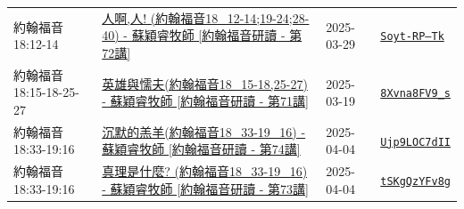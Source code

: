 \documentclass{book}
\begin{document}
{\begin{xltabular}{\textwidth}{|p{0.15\textwidth} p{0.6\textwidth}|p{0.07\textwidth} p{0.1\textwidth}|}
約翰福音 18:12-14 & \hyperref[sec:Soyt_RP__Tk]{人啊,人! (約翰福音18\_12-14;19-24;28-40) - 蘇穎睿牧師 [約翰福音研讀 - 第72講]} & 2025-03-29 & \href{https://youtube.com/watch?v=Soyt-RP--Tk}{\texttt{Soyt-RP--Tk}} \\
約翰福音 18:15-18-25-27 & \hyperref[sec:8Xvna8FV9_s]{英雄與懦夫(約翰福音18\_15-18,25-27) - 蘇穎睿牧師 [約翰福音研讀 - 第71講]} & 2025-03-19 & \href{https://youtube.com/watch?v=8Xvna8FV9_s}{\texttt{8Xvna8FV9\_s}} \\
約翰福音 18:33-19:16 & \hyperref[sec:Ujp9LOC7dII]{沉默的羔羊(約翰福音18\_33-19\_16) - 蘇穎睿牧師 [約翰福音研讀 - 第74講]} & 2025-04-04 & \href{https://youtube.com/watch?v=Ujp9LOC7dII}{\texttt{Ujp9LOC7dII}} \\
約翰福音 18:33-19:16 & \hyperref[sec:tSKgQzYFv8g]{真理是什麼? (約翰福音18\_33-19\_16) - 蘇穎睿牧師 [約翰福音研讀 - 第73講]} & 2025-04-04 & \href{https://youtube.com/watch?v=tSKgQzYFv8g}{\texttt{tSKgQzYFv8g}} \\
\hline
\end{xltabular}
}
\newpage
\end{document}
